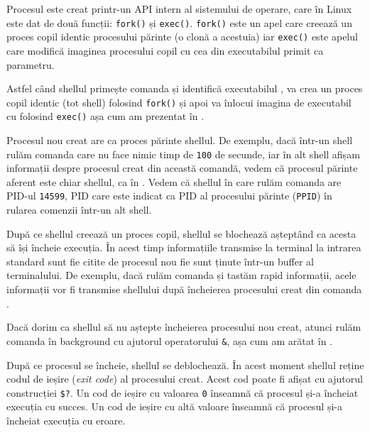 Procesul este creat printr-un API intern al sistemului de operare, care în Linux
este dat de două funcții: \texttt{fork()} și \texttt{exec()}. \texttt{fork()} este un apel care creează un
proces copil identic procesului părinte (o clonă a acestuia) iar \texttt{exec()} este
apelul care modifică imaginea procesului copil cu cea din executabilul primit ca
parametru.

Astfel când shellul primește comanda  și identifică executabilul , va
crea un proces copil identic (tot shell) folosind \texttt{fork()} și apoi va înlocui
imagina de executabil cu  folosind \texttt{exec()} așa cum am prezentat în .

Procesul nou creat are ca proces părinte shellul. De exemplu, dacă într-un
shell rulăm comanda  care nu face nimic timp de \texttt{100} de secunde, iar în
alt shell afișam informații despre procesul creat din această comandă, vedem că
procesul părinte aferent este chiar shellul, ca în . Vedem că shellul în care rulăm comanda  are PID-ul \texttt{14599}, PID care este indicat ca PID al procesului părinte (\texttt{PPID}) în rularea comenzii  într-un alt shell.


După ce shellul creează un proces copil, shellul se blochează așteptând ca
acesta să își încheie execuția. În acest timp informațiile transmise la terminal
la intrarea standard sunt fie citite de procesul nou fie sunt ținute într-un
buffer al terminalului. De exemplu, dacă rulăm comanda  și tastăm rapid
informații, acele informații vor fi transmise shellului după încheierea
procesului creat din comanda .

Dacă dorim ca shellul să nu aștepte încheierea procesului nou creat, atunci
rulăm comanda în background cu ajutorul operatorului \texttt{\&}, așa cum am arătat în
.

După ce procesul se încheie, shellul se deblochează. În
acest moment shellul reține codul de ieșire (\textit{exit code}) al procesului creat.
Acest cod poate fi afișat cu ajutorul construcției \texttt{\$?}.
Un cod de ieșire cu valoarea \texttt{0} înseamnă că procesul și-a încheiat execuția cu succes.
Un cod de ieșire cu altă valoare înseamnă că procesul și-a încheiat execuția cu eroare.

